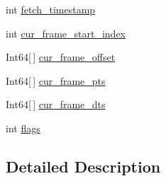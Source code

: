 \begin{DoxyCompactItemize}
\item 
int \hyperlink{struct_tao_1_1_f_fmpeg_1_1_f_fmpeg_1_1_a_v_codec_parser_context_a159515a931904693fbaead0651820005}{fetch\_\-timestamp}
\item 
int \hyperlink{struct_tao_1_1_f_fmpeg_1_1_f_fmpeg_1_1_a_v_codec_parser_context_a912a09c21571751a451c51f8cebf993d}{cur\_\-frame\_\-start\_\-index}
\item 
Int64\mbox{[}$\,$\mbox{]} \hyperlink{struct_tao_1_1_f_fmpeg_1_1_f_fmpeg_1_1_a_v_codec_parser_context_a5a4048120f6aac43576abe973eee528f}{cur\_\-frame\_\-offset}
\item 
Int64\mbox{[}$\,$\mbox{]} \hyperlink{struct_tao_1_1_f_fmpeg_1_1_f_fmpeg_1_1_a_v_codec_parser_context_ad29c59b23f92db28d7fc3fa243b3d7b5}{cur\_\-frame\_\-pts}
\item 
Int64\mbox{[}$\,$\mbox{]} \hyperlink{struct_tao_1_1_f_fmpeg_1_1_f_fmpeg_1_1_a_v_codec_parser_context_a4e71814e445724f103ea128c5dd134ef}{cur\_\-frame\_\-dts}
\item 
int \hyperlink{struct_tao_1_1_f_fmpeg_1_1_f_fmpeg_1_1_a_v_codec_parser_context_ab0262afc81c310934d798d61aa8ea1d1}{flags}
\end{DoxyCompactItemize}


\subsection{Detailed Description}


